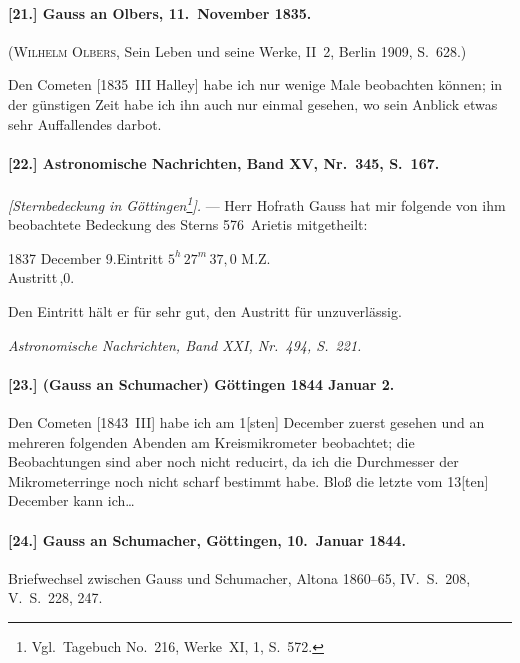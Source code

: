 \documentclass[12pt,a4paper]{article}
\theoremstyle{plain}
\theoremstyle{definition}
\theoremstyle{remark}
\begin{document}
\paragraph{[21.] Gauss an Olbers, 11.~November 1835.}

(\textsc{Wilhelm Olbers}, Sein Leben und seine Werke, II~2, Berlin 1909, S.~628.)

Den Cometen [1835~III Halley] habe ich nur wenige Male beobachten können; in der günstigen Zeit habe ich ihn auch nur einmal gesehen, wo sein Anblick etwas sehr Auffallendes darbot.

\newpage
\paragraph{[22.] Astronomische Nachrichten, Band XV, Nr.~345, S.~167.}

\textit{[Sternbedeckung in Göttingen\footnote{Vgl.\ Tagebuch No.~216, Werke~XI, 1, S.~572.}].} --- Herr Hofrath Gauss hat mir folgende von ihm beobachtete Bedeckung des Sterns 576~Arietis mitgetheilt:

\begin{center}
1837 December 9.\quad Eintritt $5^h\,27^m\,37{,}0$ M.Z.\\
\quad\quad\quad\quad\quad\quad\quad\quad Austritt\,,0.
\end{center}

Den Eintritt hält er für sehr gut, den Austritt für unzuverlässig.

\textit{Astronomische Nachrichten, Band XXI, Nr.~494, S.~221.}

\paragraph{[23.] (Gauss an Schumacher) Göttingen 1844 Januar 2.}

Den Cometen [1843~III] habe ich am 1[sten] December zuerst gesehen und an mehreren folgenden Abenden am Kreismikrometer beobachtet; die Beobachtungen sind aber noch nicht reducirt, da ich die Durchmesser der Mikrometerringe noch nicht scharf bestimmt habe. Bloß die letzte vom 13[ten] December kann ich\ldots

\paragraph{[24.] Gauss an Schumacher, Göttingen, 10.~Januar 1844.}

Briefwechsel zwischen Gauss und Schumacher, Altona 1860--65, IV.\ S.~208, V.\ S.~228, 247.
\end{document}
